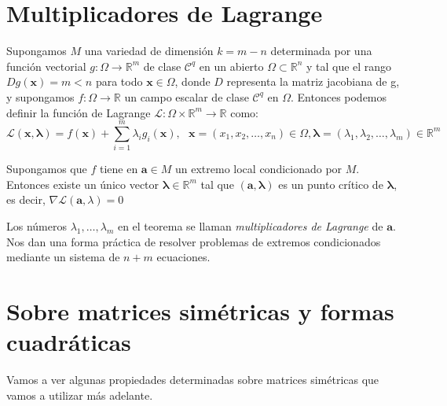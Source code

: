 \begin{definicion}
\end{definicion}

\begin{definicion}
\end{definicion}

\section{Multiplicadores de Lagrange}

\begin{definicion}
Supongamos $M$ una variedad de dimensión $k=m-n$ determinada por una función vectorial $g: \Omega \rightarrow \mathbb{R}^m$ de clase $\mathcal{C}^q$ en un abierto $\Omega \subset \mathbb{R}^n$ y tal que el rango $Dg(\mathbf{x}) = m < n$ para todo $\mathbf{x} \in \Omega$, donde $D$ representa la matriz jacobiana de g, y supongamos $f: \Omega \rightarrow \mathbb{R}$ un campo escalar de clase $\mathcal{C}^q$ en $\Omega$. Entonces podemos definir la función de Lagrange $\mathcal{L}: \Omega \times \mathbb{R}^m \rightarrow \mathbb{R}$ como:
\[	\mathcal{L}(\mathbf{x}, \mathbf{\lambda}) = f(\mathbf{x}) + \sum_{i=1}^{m} \lambda_ig_i(\mathbf{x}), \ \ \  \mathbf{x} = (x_1, x_2, \dots, x_n) \in \Omega, \mathbf{\lambda} = (\lambda_1, \lambda_2, \dots, \lambda_m) \in \mathbb{R}^m	\]
\end{definicion}

\begin{teorema}[de Lagrange]
Supongamos que $f$ tiene en $\mathbf{a} \in M$ un extremo local condicionado por $M$. Entonces existe un único vector $\mathbf{\lambda} \in \mathbb{R}^m$ tal que $(\mathbf{a}, \mathbf{\lambda})$ es un punto crítico de $\mathbf{\lambda}$, es decir, $\nabla \mathcal{L}(\mathbf{a}, \mathbb{\lambda}) = 0$
\end{teorema}

Los números $\lambda_1, \dots, \lambda_m$ en el teorema se llaman \textit{multiplicadores de Lagrange} de $\mathbf{a}$. Nos dan una forma práctica de resolver problemas de extremos condicionados mediante un sistema de $n+m$ ecuaciones.

\section{Sobre matrices simétricas y formas cuadráticas}
Vamos a ver algunas propiedades determinadas sobre matrices simétricas que vamos a utilizar más adelante.\\

